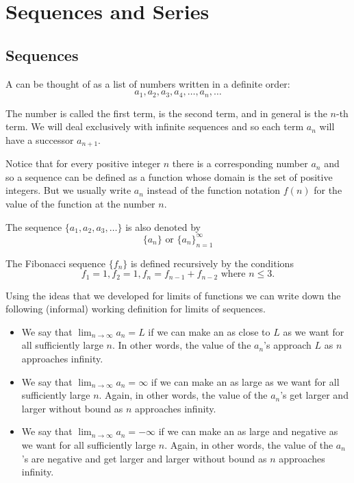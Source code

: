 \chapter{Sequences and Series}
\section{Sequences}
\begin{definition}
A  can be thought of as a list of numbers written in a definite order:
\[ a_1, a_2, a_3, a_4, \dots, a_n, \dots \]
\end{definition}

The number is called the first term, is the second term, and in general is the $n$-th term. We will deal exclusively with infinite sequences and so each term $a_n$ will have a successor $a_{n+1}$.

Notice that for every positive integer $n$ there is a corresponding number $a_n$ and so a sequence can be defined as a function whose domain is the set of positive integers. But we usually write $a_n$ instead of the function notation $f(n)$ for the value of the function at the number $n$.

\begin{notation}
The sequence $\{a_1,a_2,a_3,\dots\}$ is also denoted by
\[ \{a_n\} \text{ or } \{a_n\}_{n=1}^\infty \]
\end{notation}

\begin{example}
The Fibonacci sequence $\{f_n\}$ is defined recursively by the conditions
\[ f_1=1, f_2=1, f_n=f_{n-1}+f_{n-2} \text{ where } n\le3. \]
\end{example}

Using the ideas that we developed for limits of functions we can write down the following (informal) working definition for limits of sequences.
\begin{itemize}
\item We say that $\lim_{n\to\infty}a_n=L$ if we can make an as close to $L$ as we want for all sufficiently large $n$. In other words, the value of the $a_n$'s approach $L$ as $n$ approaches infinity.
\item We say that $\lim_{n\to\infty}a_n=\infty$ if we can make an as large as we want for all sufficiently large $n$. Again, in other words, the value of the $a_n$'s get larger and larger without bound as $n$ approaches infinity.
\item We say that $\lim_{n\to\infty}a_n=-\infty$ if we can make an as large and negative as we want for all sufficiently large $n$. Again, in other words, the value of the $a_n$'s are negative and get larger and larger without bound as $n$ approaches infinity.
\end{itemize}

